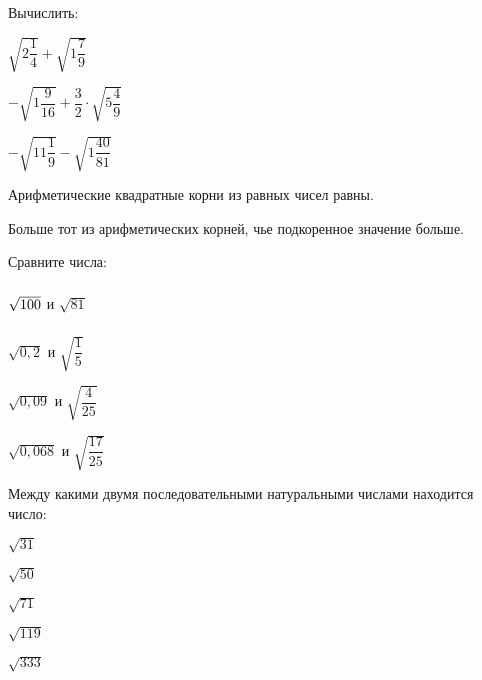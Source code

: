 \begin{class}[number=2]
\begin{listofex}
\begin{enumcols}[itemcolumns=2]
		\end{enumcols}
		\item Вычислить:
		\begin{enumcols}[itemcolumns=3]
			\item \( \sqrt{2\dfrac{1}{4}}+\sqrt{1\dfrac{7}{9}} \)
			\item \( -\sqrt{1\dfrac{9}{16}}+\dfrac{3}{2}\cdot\sqrt{5\dfrac{4}{9}} \)
			\item \( -\sqrt{11\dfrac{1}{9}}-\sqrt{1\dfrac{40}{81}} \)
		\end{enumcols}
	\end{listofex}
	\begin{definit}
		Арифметические квадратные корни из равных чисел равны.
	\end{definit}
	\begin{definit}
		Больше тот из арифметических корней, чье подкоренное значение больше.
	\end{definit}
	\begin{listofex}[resume]
		\item Сравните числа:
		\begin{enumcols}[itemcolumns=4]
			\item \( \vphantom{\sqrt{\dfrac{1}{5}}}\sqrt{100} \) и \( \sqrt{81} \)
			\item \( \sqrt{0,2} \) и \( \sqrt{\dfrac{1}{5}} \)
			\item \( \sqrt{0,09} \) и \( \sqrt{\dfrac{4}{25}} \)
			\item \( \sqrt{0,068} \) и \( \sqrt{\dfrac{17}{25}} \)
		\end{enumcols}
		\item Между какими двумя последовательными натуральными числами находится число:
		\begin{enumcols}[itemcolumns=5]
			\item \( \sqrt{31} \)
			\item \( \sqrt{50} \)
			\item \( \sqrt{71} \)
			\item \( \sqrt{119} \)
			\item \( \sqrt{333} \)
		\end{enumcols}

\end{listofex}
\end{class}
